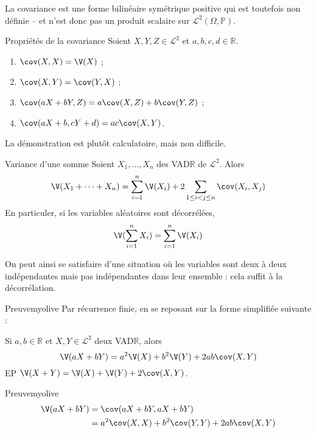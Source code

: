     La covariance est une forme bilinéaire symétrique positive qui est toutefois non définie -- et n’est donc pas un produit scalaire sur $\mathcal{L}^2(\Omega, \mathbb{P})$. 

    \begin{prop}{Propriétés de la covariance}{}
        Soient $X,Y, Z \in \mathcal{L}^2$ et $a,b,c,d \in \mathbb{R}$. 
        \begin{enumerate}
            \item $\cov(X,X) = \V(X)$ ;
            \item $\cov(X,Y) = \cov(Y,X)$ ;
            \item $\cov(aX + bY, Z) = a\cov(X,Z) + b \cov(Y,Z)$ ;
            \item $\cov(aX + b, cY + d) = ac \cov(X,Y)$.
        \end{enumerate}
    \end{prop}

    La démonstration est plutôt calculatoire, mais non difficile. 

    \begin{prop}{Variance d’une somme}{}
        Soient $X_1,\ldots,X_n$ des VAD$\mathbb{R}$ de $\mathcal{L}^2$. Alors 
        \[ \V(X_1 + \cdots + X_n) = \sum_{i=1}^n \V(X_i) + 2 \sum_{1 \leq i < j \leq n} \cov(X_i,X_j) \]
        En particuler, si les variables aléatoires sont décorrélées, 
        \[ \V(\sum_{i=1}^{n} X_i) = \sum_{i=1}^{n} \V(X_i) \]   
    \end{prop}

    On peut ainsi se satisfaire d’une situation où les variables sont deux à deux indépendantes mais pas indépendantes dans leur ensemble : cela suffit à la décorrélation.

    \begin{demo}{Preuve}{myolive}
        Par récurrence finie, en se reposant sur la forme simplifiée suivante : 
    \end{demo}

    \begin{prop}{}{}
        Si $a,b \in \mathbb{R}$ et $X,Y \in \mathcal{L}^2$ deux VAD$\mathbb{R}$, alors 
        \[ \V(aX + bY) = a^2 \V(X) + b^2 \V(Y) + 2ab \cov(X,Y) \]   
        EP $\V(X + Y) = \V(X) + \V(Y) + 2 \cov(X,Y)$.
    \end{prop}

    \begin{demo}{Preuve}{myolive}
        \begin{align*}
            \V(aX + bY) 
            &= \cov(aX + bY, aX + bY) \\
            &= a^2 \cov(X,X) + b^2 \cov(Y,Y) + 2ab\cov(X,Y) 
        \end{align*}
    \end{demo}

